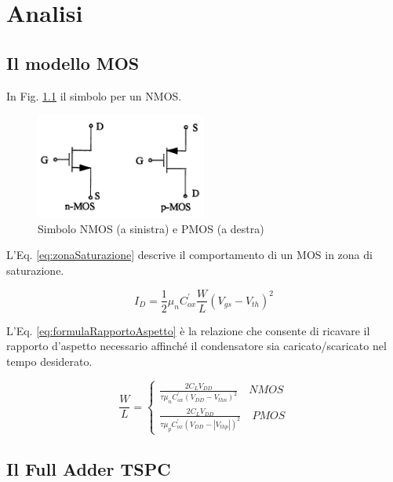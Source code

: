 
\chapter{Analisi} %
\label{Chapter2}

\section{Il modello MOS}
\label{sec:mos}

In Fig. \ref{fig:simboliMos} il simbolo per un NMOS.

\begin{figure}[hbt!]
	\centering
	\includegraphics[width=0.5\textwidth]{figure/simboliMos.png}
	\caption{Simbolo NMOS (a sinistra) e PMOS (a destra)}
	\label{fig:simboliMos}
\end{figure}

L'Eq. \ref{eq:zonaSaturazione} descrive il comportamento di un MOS in zona di saturazione.

\begin{equation}
	I_{D} = \frac{1}{2} \mu _{n} C^{'}_{ox} \frac{W}{L} (V_{gs}-V_{th})^2
	\label{eq:zonaSaturazione}
\end{equation}

L'Eq. \ref{eq:formulaRapportoAspetto} è la relazione che consente di ricavare il rapporto d'aspetto necessario affinché il condensatore sia caricato/scaricato nel tempo desiderato.

\begin{equation}
\frac{W}{L} =
\begin{cases}
\frac{2C_{L}V_{DD}}{\tau \mu _{n} C^{'}_{ox} (V_{DD}-V_{thn})^2} \quad NMOS\\
\frac{2C_{L}V_{DD}}{\tau \mu _{p} C^{'}_{ox} (V_{DD}-|V_{thp}|)^2} \quad PMOS
\end{cases}
\label{eq:formulaRapportoAspetto}
\end{equation}

\section{Il Full Adder TSPC}
\label{sec:fullAdder}






